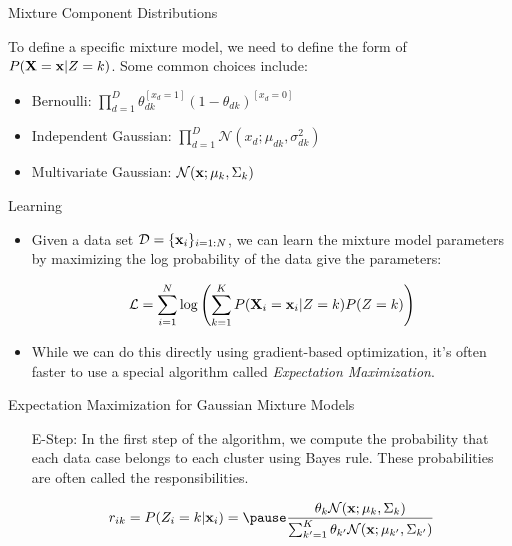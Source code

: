 \documentclass[serif,xcolor=pdftex,dvipsnames,table,hyperref={bookmarks=false,breaklinks}]{beamer}
\begin{document}
\begin{frame}[t]{Mixture Component Distributions}

To define a specific mixture model, we need to define the form of 
$P({\mathbf{X}}={\mathbf{x}}|Z=k)$. Some common choices include:

\begin{itemize}
\pause \item Bernoulli: $\displaystyle \prod_{d=1}^D 
\theta_{dk}^{[x_d=1]}(1-\theta_{dk})^{[x_d=0]}$

\pause \item Independent Gaussian: $\displaystyle \prod_{d=1}^D 
\mathcal{N}(x_d;\mu_{dk}, \sigma^2_{dk})$

\pause \item Multivariate Gaussian: $\displaystyle  
\mathcal{N}({\mathbf{x}};\mu_{k},\Sigma_k)$

\end{itemize}
\end{frame}

\begin{frame}[t]{Learning}

\begin{itemize}
\item Given a data set $\mathcal{D}=\{{\mathbf{x}}_i\}_{i=1:N}$, we can learn the
mixture model parameters by maximizing the log probability of the data give 
the parameters:

$$\mathcal{L} = \sum_{i=1}^N 
\log\left(\sum_{k=1}^KP({\mathbf{X}}_i={\mathbf{x}}_i|Z=k)P(Z=k)\right)$$


\pause\item While we can do this directly using gradient-based optimization, 
it's often faster to use a special algorithm called \textit{Expectation 
Maximization}.

\end{itemize}
\end{frame}

\begin{frame}[t]{Expectation Maximization for Gaussian Mixture Models}

\begin{itemize}
\item[E-Step:] In the first step of the algorithm, we compute the 
probability that each data case belongs to each cluster using Bayes rule. These 
probabilities are often called the responsibilities. 

\Large
$$\displaystyle r_{ik} = P(Z_i=k|\mbf{x}_i)=\pause 
\frac{\theta_k \mathcal{N}(\mbf{x};\mu_{k},\Sigma_k)}{\sum_{k'=1}^K\theta_{k'} 
\mathcal{N}(\mbf{x};\mu_{k'},\Sigma_{k'})}$$



\end{itemize}
\end{frame}
\end{document}

